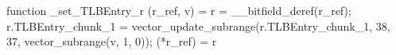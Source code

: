 function _set_TLBEntry_r (r_ref, v) = {
    r = __bitfield_deref(r_ref);
    r.TLBEntry_chunk_1 = vector_update_subrange(r.TLBEntry_chunk_1, 38, 37, vector_subrange(v, 1, 0));
    (*r_ref) = r
}
